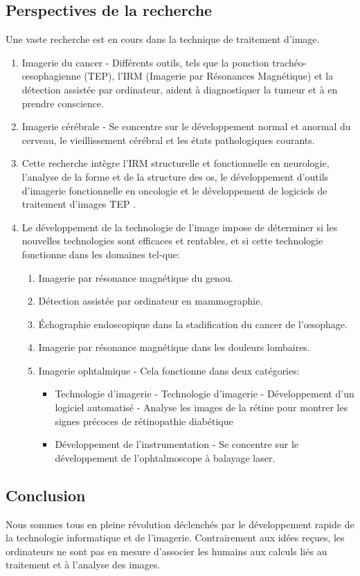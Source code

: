 \documentclass[12pt]{article}
\begin{document}
\subsection{Perspectives de la recherche}
Une vaste recherche est en cours dans la technique de traitement d'image.
\begin{enumerate}
	\item Imagerie du cancer - Différents outils, tels que la ponction trachéo-œsophagienne (TEP), l'IRM (Imagerie par Résonances Magnétique) et la détection assistée par ordinateur, aident à diagnostiquer la tumeur et à en prendre conscience.
	\item Imagerie cérébrale - Se concentre sur le développement normal et anormal du cerveau, le vieillissement cérébral et les états pathologiques courants.
	\item Cette recherche intègre l'IRM structurelle et fonctionnelle en neurologie, l'analyse de la forme et de la structure des os, le développement d'outils d'imagerie fonctionnelle en oncologie et le développement de logiciels de traitement d'images TEP \cite{25}.
	\item Le développement de la technologie de l'image impose de déterminer si les nouvelles technologies sont efficaces et rentables, et si cette technologie fonctionne dans les domaines tel-que:
	\begin{enumerate}
		\item Imagerie par résonance magnétique du genou.
		\item Détection assistée par ordinateur en mammographie.
		\item Échographie endoscopique dans la stadification du cancer de l'œsophage.
		\item Imagerie par résonance magnétique dans les douleurs lombaires.
		\item Imagerie ophtalmique - Cela fonctionne dans deux catégories:
		\begin{itemize}
			\item Technologie d'imagerie - Technologie d'imagerie - Développement d'un logiciel automatisé - Analyse les images de la rétine pour montrer les signes précoces de rétinopathie diabétique
			\item Développement de l'instrumentation - Se concentre sur le développement de l'ophtalmoscope à balayage laser.
		\end{itemize}
	\end{enumerate}
\end{enumerate}

\subsection{Conclusion}
Nous sommes tous en pleine révolution déclenchés par le développement rapide de la technologie informatique et de l'imagerie. Contrairement aux idées reçues, les ordinateurs ne sont pas en mesure d’associer les humains aux calculs liés au traitement et à l’analyse des images.
\end{document}

